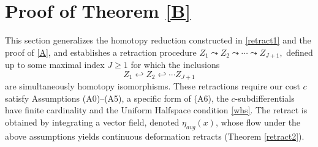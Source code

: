 \documentclass[12pt]{amsart}
\theoremstyle{definition}
\newtheorem{dfn}{Definition}
\theoremstyle{remark}
\newcommand{\bR}{\mathbb{R}}
\newcommand{\del}{\partial}
\newcommand{\hh}{\hookleftarrow}
\begin{document}



\section{Proof of Theorem \ref{B}}\label{zz}

This section generalizes the homotopy reduction constructed in \ref{retract1} and the proof of \ref{A}, and establishes a retraction procedure $Z_1 \leadsto Z_2 \leadsto \cdots \leadsto Z_{J+1},$ defined up to some maximal index $J \geq 1$ for which the inclusions $$Z_1 \hh Z_2 \hh \cdots Z_{J+1}$$ are simultaneously homotopy isomorphisms. These retractions require our cost $c$ satisfy Assumptions (A0)--(A5), a specific form of (A6), the $c$-subdifferentials have finite cardinality and the Uniform Halfspace condition \ref{whs}. The retract is obtained by integrating a vector field, denoted $\eta_{avg}(x)$, whose flow under the above assumptions yields continuous deformation retracts (Theorem \ref{retract2}). %



\end{document}
